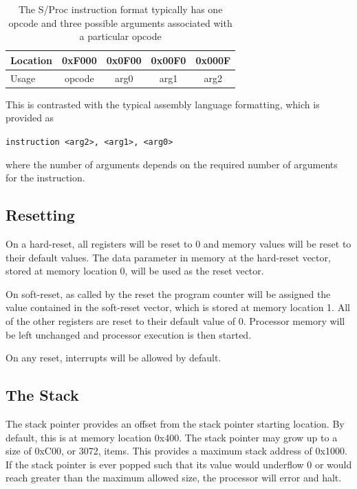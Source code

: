 \documentclass{article}
\begin{document}
\begin{table}[h!]
	\centering
	\begin{tabular}{l|cccc}
		\hline
		Location & 0xF000 & 0x0F00 & 0x00F0 & 0x000F \\
		\hline
		Usage & opcode & arg0 & arg1 & arg2 \\
		\hline
	\end{tabular}
	\caption{The S/Proc instruction format typically has one opcode and three possible arguments associated with a particular opcode}
	\label{table:instruction-formatting}
\end{table}

This is contrasted with the typical assembly language formatting, which is provided as

\begin{center}
	\texttt{instruction <arg2>, <arg1>, <arg0>}
\end{center}

where the number of arguments depends on the required number of arguments for the instruction.

\subsection{Resetting}

On a hard-reset, all registers will be reset to 0 and memory values will be reset to their default values. The data parameter in memory at the hard-reset vector, stored at memory location 0, will be used as the reset vector.

On soft-reset, as called by the reset the program counter will be assigned the value contained in the soft-reset vector, which is stored at memory location 1. All of the other registers are reset to their default value of 0. Processor memory will be left unchanged and processor execution is then started.

On any reset, interrupts will be allowed by default.

\subsection{The Stack}
\label{sec:the-stack}

The stack pointer provides an offset from the stack pointer starting location. By default, this is at memory location 0x400. The stack pointer may grow up to a size of 0xC00, or 3072, items. This provides a maximum stack address of 0x1000. If the stack pointer is ever popped such that its value would underflow 0 or would reach greater than the maximum allowed size, the processor will error and halt.
\end{document}
